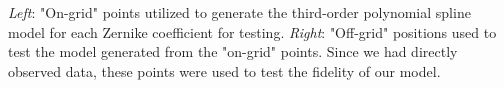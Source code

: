 \textit{Left}: "On-grid" points utilized to generate the third-order polynomial spline model for each Zernike coefficient for testing. \textit{Right}: "Off-grid" positions used to test the model generated from the "on-grid" points. Since we had directly observed data, these points were used to test the fidelity of our model.
  